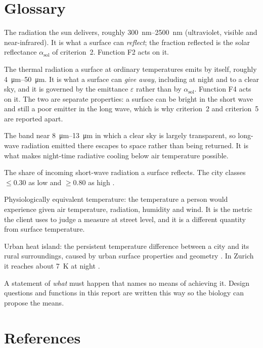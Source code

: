 \documentclass[11pt,a4paper]{article}
\begin{document}


\tableofcontents
\newpage







\section{Glossary}
\label{sec:glossary}

\begin{description}\setlength{\itemsep}{2pt}
  \item[Short-wave radiation] The radiation the sun delivers, roughly
    \qtyrange{300}{2500}{\nano\metre} (ultraviolet, visible and near-infrared).
    It is what a surface can \emph{reflect}; the fraction reflected is the solar
    reflectance $\alpha_\mathrm{sol}$ of criterion~2. Function F2 acts on it.
  \item[Long-wave radiation] The thermal radiation a surface at ordinary
    temperatures emits by itself, roughly \qtyrange{4}{50}{\micro\metre}. It is
    what a surface can \emph{give away}, including at night and to a clear sky,
    and it is governed by the emittance $\varepsilon$ rather than by
    $\alpha_\mathrm{sol}$. Function F4 acts on it. The two are separate
    properties: a surface can be bright in the short wave and still a poor
    emitter in the long wave, which is why criterion~2 and criterion~5 are
    reported apart.
  \item[Atmospheric window] The band near \qtyrange{8}{13}{\micro\metre} in
    which a clear sky is largely transparent, so long-wave radiation emitted
    there escapes to space rather than being returned. It is what makes
    night-time radiative cooling below air temperature possible.
  \item[Albedo] The share of incoming short-wave radiation a surface reflects.
    The city classes $\leq 0.30$ as low and $\geq 0.80$ as high
    \parencite[128]{stadtzuerich2020}.
  \item[PET] Physiologically equivalent temperature: the temperature a person
    would experience given air temperature, radiation, humidity and wind. It is
    the metric the client uses to judge a measure at street level, and it is a
    different quantity from surface temperature.
  \item[UHI] Urban heat island: the persistent temperature difference between a
    city and its rural surroundings, caused by urban surface properties and
    geometry \parencite{oke1982}. In Zurich it reaches about \qty{7}{\kelvin} at
    night \parencite{stadtzuerich_merkblatt}.
  \item[Solution-neutral] A statement of \emph{what} must happen that names no
    means of achieving it. Design questions and functions in this report are
    written this way so the biology can propose the means.
\end{description}

\section{References}
\printbibliography[heading=none]

\appendix

\end{document}
